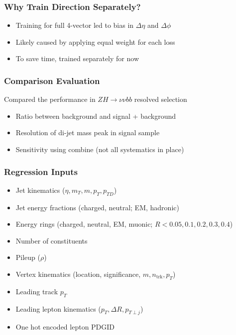 \documentclass{beamer}
\begin{document}
\begin{frame}
  \frametitle{Why Train Direction Separately?}

  \begin{itemize}
  \item Training for full 4-vector led to bias in
    $\Delta \eta$ and $\Delta \phi$ 
  \item Likely caused by applying equal weight for each loss
  \item To save time, trained separately for now
  \end{itemize}

\end{frame}

\begin{frame}
  \frametitle{Comparison Evaluation}

  Compared the performance in $ZH \rightarrow \nu\nu bb$ resolved selection

  \begin{itemize}
  \item Ratio between background and signal + background
  \item Resolution of di-jet mass peak in signal sample
  \item Sensitivity using combine (not all systematics in place)
  \end{itemize}

\end{frame}

\begin{frame}
  \frametitle{Regression Inputs}

  \begin{itemize}
  \item Jet kinematics ($\eta, m_T, m, p_T, p_{TD}$)
  \item Jet energy fractions (charged, neutral; EM, hadronic)
  \item Energy rings (charged, neutral, EM, muonic; $R < 0.05, 0.1, 0.2, 0.3, 0.4$)
  \item Number of constituents
  \item Pileup ($\rho$)
  \item Vertex kinematics (location, significance, $m, n_\mathrm{trk}, p_T$)
  \item Leading track $p_T$
  \item Leading lepton kinematics ($p_T, \Delta R, p_{T\perp j}$)
  \item One hot encoded lepton PDGID
  \end{itemize}

\end{frame}
\end{document}
